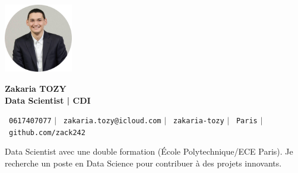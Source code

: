 \documentclass[11pt,a4paper]{article}
\begin{document}
\begin{flushleft}
  \begin{minipage}[c]{0.2\textwidth}
    \includegraphics[width=3cm]{images/profilpicture.png}
  \end{minipage}%
  \begin{minipage}[c]{0.8\textwidth}
    {\Huge \textbf{Zakaria TOZY}} \\[5pt]
    {\Large \textbf{Data Scientist | CDI}}
  \end{minipage}
\end{flushleft}

\vspace{-5pt}

\begin{center}
    \small \faPhone\ \texttt{0617407077} \hspace{1pt} $|$
    \hspace{1pt} \faEnvelope\ \texttt{zakaria.tozy@icloud.com} \hspace{1pt} $|$
    \hspace{1pt} \faLinkedin\ \texttt{zakaria-tozy} \hspace{1pt} $|$
    \hspace{1pt} \faMapMarker\ \texttt{Paris} \hspace{1pt} $|$
    \hspace{1pt} \faGithub\ \texttt{github.com/zack242} \\ \vspace{0pt}
\end{center}

\begin{itemize}[leftmargin=0in, label={}]
\footnotesize{\item{
Data Scientist avec une double formation (École Polytechnique/ECE Paris). Je recherche un poste en Data Science pour contribuer à des projets innovants.
}}
\end{itemize}
\end{document}
